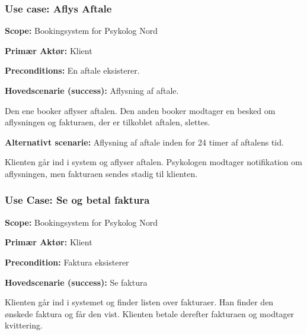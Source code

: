 \subsubsection{Use case: Aflys Aftale}
{\setlength{\parindent}{0cm}
\textbf{Scope:} Bookingsystem for Psykolog Nord

\textbf{Primær Aktør:} Klient

\textbf{Preconditions:} En aftale eksisterer.

\textbf{Hovedscenarie (success):} Aflysning af aftale.

Den ene booker aflyser aftalen.
Den anden booker modtager en besked om aflysningen og fakturaen, der er tilkoblet aftalen, slettes.

\textbf{Alternativt scenarie:} Aflysning af aftale inden for 24 timer af aftalens tid.

Klienten går ind i system og aflyser aftalen.
Psykologen modtager notifikation om aflysningen, men fakturaen sendes stadig til klienten.

}

\subsubsection{Use Case: Se og betal faktura}
{\setlength{\parindent}{0cm}
\textbf{Scope:} Bookingsystem for Psykolog Nord

\textbf{Primær Aktør:} Klient

\textbf{Precondition:} Faktura eksisterer

\textbf{Hovedscenarie (success):} Se faktura

Klienten går ind i systemet og finder listen over fakturaer. 
Han finder den ønskede faktura og får den vist. Klienten betale derefter fakturaen og modtager kvittering.
}
